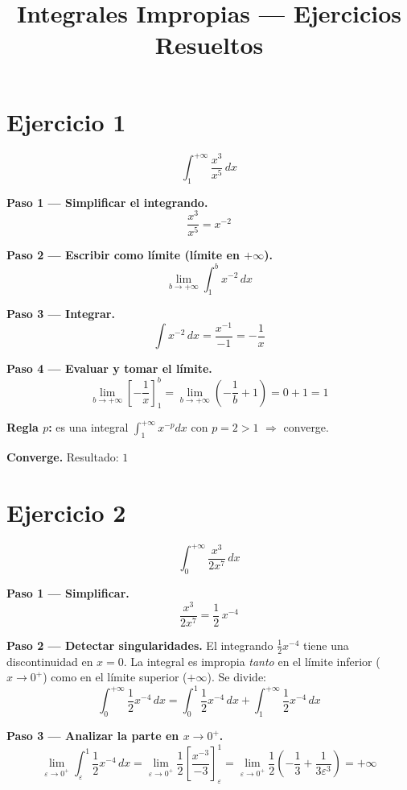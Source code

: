 \documentclass[12pt,a4paper]{article}
\title{\textbf{Integrales Impropias — Ejercicios Resueltos}}
\author{}
\date{}
\newcommand{\converge}[1]{%
  \textcolor{resultcolor}{\textbf{Converge.} Resultado: $#1$}%
}
\begin{document}
\maketitle

\section*{Ejercicio 1}
\[
  \int_{1}^{+\infty} \frac{x^3}{x^5}\,dx
\]

\textbf{Paso 1 — Simplificar el integrando.}
\[
  \frac{x^3}{x^5} = x^{-2}
\]

\textbf{Paso 2 — Escribir como límite (límite en $+\infty$).}
\[
  \lim_{b\to+\infty} \int_{1}^{b} x^{-2}\,dx
\]

\textbf{Paso 3 — Integrar.}
\[
  \int x^{-2}\,dx = \frac{x^{-1}}{-1} = -\frac{1}{x}
\]

\textbf{Paso 4 — Evaluar y tomar el límite.}
\[
  \lim_{b\to+\infty} \left[-\frac{1}{x}\right]_{1}^{b}
  = \lim_{b\to+\infty} \left(-\frac{1}{b} + 1\right)
  = 0 + 1 = 1
\]

\textbf{Regla $p$:} es una integral $\int_1^{+\infty} x^{-p}dx$ con $p=2>1$ $\Rightarrow$ converge.

\medskip\converge{1}

\bigskip
\section*{Ejercicio 2}
\[
  \int_{0}^{+\infty} \frac{x^3}{2x^7}\,dx
\]

\textbf{Paso 1 — Simplificar.}
\[
  \frac{x^3}{2x^7} = \frac{1}{2}\,x^{-4}
\]

\textbf{Paso 2 — Detectar singularidades.}
El integrando $\frac{1}{2}x^{-4}$ tiene una discontinuidad en $x=0$. La integral es impropia \emph{tanto} en el límite inferior ($x\to 0^+$) como en el límite superior ($+\infty$). Se divide:
\[
  \int_{0}^{+\infty} \frac{1}{2}x^{-4}\,dx
  = \int_{0}^{1} \frac{1}{2}x^{-4}\,dx + \int_{1}^{+\infty} \frac{1}{2}x^{-4}\,dx
\]

\textbf{Paso 3 — Analizar la parte en $x\to 0^+$.}
\[
  \lim_{\varepsilon\to 0^+}\int_{\varepsilon}^{1} \frac{1}{2}x^{-4}\,dx
  = \lim_{\varepsilon\to 0^+} \frac{1}{2}\left[\frac{x^{-3}}{-3}\right]_{\varepsilon}^{1}
  = \lim_{\varepsilon\to 0^+} \frac{1}{2}\left(-\frac{1}{3} + \frac{1}{3\varepsilon^3}\right)
  = +\infty
\]
\end{document}
